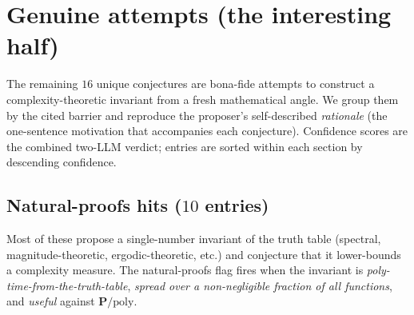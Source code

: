 \documentclass[11pt,a4paper]{article}
\begin{document}
\section{Genuine attempts (the interesting half)}\label{sec:genuine}

The remaining $16$ unique conjectures are bona-fide attempts to
construct a complexity-theoretic invariant from a fresh mathematical
angle. We group them by the cited barrier and reproduce the proposer's
self-described \emph{rationale} (the one-sentence motivation that
accompanies each conjecture). Confidence scores are the
combined two-LLM verdict; entries are sorted within each section by
descending confidence.

\subsection{Natural-proofs hits ($10$ entries)}\label{sec:np-genuine}

Most of these propose a single-number invariant of the truth table
(spectral, magnitude-theoretic, ergodic-theoretic, etc.) and conjecture
that it lower-bounds a complexity measure. The natural-proofs flag
fires when the invariant is \emph{poly-time-from-the-truth-table},
\emph{spread over a non-negligible fraction of all functions}, and
\emph{useful} against $\mathbf{P}/\mathrm{poly}$.
\end{document}
